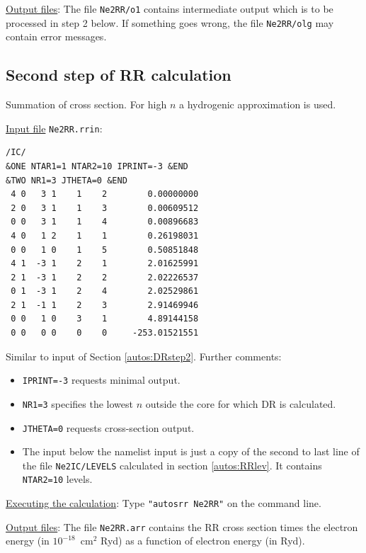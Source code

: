 \documentclass[a4paper,12pt]{article}
\begin{document}
\underline{Output files}: The file \texttt{Ne2RR/o1} contains intermediate output which is to be processed in step 2 below. If something goes wrong, the file \texttt{Ne2RR/olg} may contain error messages.

\subsection{Second step of RR calculation}\label{autos:RRstep2}

Summation of cross section. For high $n$ a hydrogenic approximation is used.

\underline{Input file} \texttt{Ne2RR.rrin}:
\begin{verbatim}
/IC/
&ONE NTAR1=1 NTAR2=10 IPRINT=-3 &END
&TWO NR1=3 JTHETA=0 &END
 4 0   3 1    1    2        0.00000000
 2 0   3 1    1    3        0.00609512
 0 0   3 1    1    4        0.00896683
 4 0   1 2    1    1        0.26198031
 0 0   1 0    1    5        0.50851848
 4 1  -3 1    2    1        2.01625991
 2 1  -3 1    2    2        2.02226537
 0 1  -3 1    2    4        2.02529861
 2 1  -1 1    2    3        2.91469946
 0 0   1 0    3    1        4.89144158
 0 0   0 0    0    0     -253.01521551
\end{verbatim}
Similar to input of Section \ref{autos:DRstep2}. Further comments:
\begin{itemize}\vspace*{-12pt}
\item \texttt{IPRINT=-3} requests minimal output.
\item \texttt{NR1=3} specifies the lowest $n$ outside the core for which DR is calculated.
\item \texttt{JTHETA=0} requests cross-section output.
\item The input below the namelist input is just a copy of the second to last line of the file \texttt{Ne2IC/LEVELS} calculated in section \ref{autos:RRlev}. It contains \texttt{NTAR2=10} levels.
\end{itemize}

\underline{Executing the calculation}: Type \texttt{"autosrr Ne2RR"} on the command line.

\underline{Output files}: The file \texttt{Ne2RR.arr} contains the RR cross section times the electron energy (in $10^{-18}$~cm$^2$ Ryd) as a function of electron energy (in Ryd).
\newpage
\printbibliography
\end{document}
